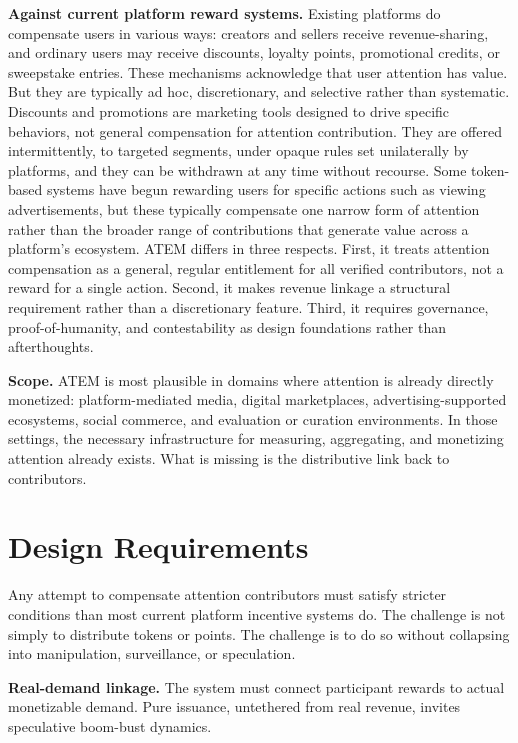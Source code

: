 \documentclass[12pt, a4paper]{article}
\begin{document}
\textbf{Against current platform reward systems.} Existing platforms do compensate users in various ways: creators and sellers receive revenue-sharing, and ordinary users may receive discounts, loyalty points, promotional credits, or sweepstake entries. These mechanisms acknowledge that user attention has value. But they are typically ad hoc, discretionary, and selective rather than systematic. Discounts and promotions are marketing tools designed to drive specific behaviors, not general compensation for attention contribution. They are offered intermittently, to targeted segments, under opaque rules set unilaterally by platforms, and they can be withdrawn at any time without recourse. Some token-based systems have begun rewarding users for specific actions such as viewing advertisements, but these typically compensate one narrow form of attention rather than the broader range of contributions that generate value across a platform's ecosystem. ATEM differs in three respects. First, it treats attention compensation as a general, regular entitlement for all verified contributors, not a reward for a single action. Second, it makes revenue linkage a structural requirement rather than a discretionary feature. Third, it requires governance, proof-of-humanity, and contestability as design foundations rather than afterthoughts.

\textbf{Scope.} ATEM is most plausible in domains where attention is already directly monetized: platform-mediated media, digital marketplaces, advertising-supported ecosystems, social commerce, and evaluation or curation environments. In those settings, the necessary infrastructure for measuring, aggregating, and monetizing attention already exists. What is missing is the distributive link back to contributors.


\section{Design Requirements}
\label{sec:design}

Any attempt to compensate attention contributors must satisfy stricter conditions than most current platform incentive systems do. The challenge is not simply to distribute tokens or points. The challenge is to do so without collapsing into manipulation, surveillance, or speculation.

\textbf{Real-demand linkage.} The system must connect participant rewards to actual monetizable demand. Pure issuance, untethered from real revenue, invites speculative boom-bust dynamics.
\end{document}

